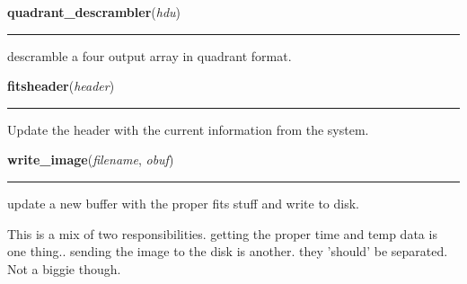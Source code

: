     \label{fits:quadrant_descrambler}

    \vspace{0.5ex}

    \begin{boxedminipage}{\textwidth}

    \raggedright \textbf{quadrant\_descrambler}(\textit{hdu})

    \vspace{-1.5ex}

    \rule{\textwidth}{0.5\fboxrule}
    descramble a four output array in quadrant format.

    \vspace{1ex}

    \end{boxedminipage}

    \label{fits:fitsheader}

    \vspace{0.5ex}

    \begin{boxedminipage}{\textwidth}

    \raggedright \textbf{fitsheader}(\textit{header})

    \vspace{-1.5ex}

    \rule{\textwidth}{0.5\fboxrule}
    Update the header with the current information from the system.

    \vspace{1ex}

    \end{boxedminipage}

    \label{fits:write_image}

    \vspace{0.5ex}

    \begin{boxedminipage}{\textwidth}

    \raggedright \textbf{write\_image}(\textit{filename}, \textit{obuf})

    \vspace{-1.5ex}

    \rule{\textwidth}{0.5\fboxrule}
    update a new buffer with the proper fits stuff and write to disk.

    This is a mix of two responsibilities. getting the proper time and temp
    data is one thing.. sending the image to the disk is another. they 
    'should' be separated. Not a biggie though.

    \vspace{1ex}

    \end{boxedminipage}


